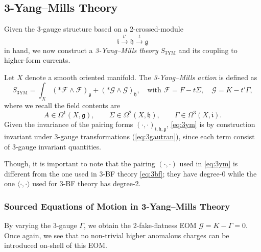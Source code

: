 \documentclass[onecolumn]{article}
\theoremstyle{theorem}
\theoremstyle{remark}
\theoremstyle{example}
\theoremstyle{definition}
\numberwithin{equation}{section}
\def\g{\mathfrak g}
\def\h{\mathfrak h}
\begin{document}
\subsection{3-Yang--Mills Theory}

Given the 3-gauge structure based on a 2-crossed-module $$ \mathfrak{i}\xrightarrow{t'}\mathfrak{h}\xrightarrow{t}\mathfrak{g}$$ 
in hand, we now construct a {\it {3-Yang--Mills theory}} $S_\text{3YM}$ and its coupling to higher-form currents.

Let $X$ denote a smooth oriented manifold. The {\it {3-Yang--Mills action}} is defined as \cite{Baez:2002highergauge,Song:2021}
\begin{equation}
    S_\text{3YM} = \int_X (\ast\mathcal{F}\wedge\mathcal{F})_\mathfrak{g}+(\ast\mathcal{G}\wedge \mathcal{G})_\h, \quad \textrm{with }  \mathcal{F} = F- t\Sigma,\quad \mathcal{G}=K - t'\Gamma,\label{eq:3ym}
\end{equation}
where we recall the field contents are
\begin{equation*}
    A\in \Omega^1(X,\mathfrak{g}),\qquad \Sigma\in\Omega^2(X,\mathfrak{h}),\qquad \Gamma\in\Omega^3(X,\mathfrak{i}).
\end{equation*}
{Given} the invariance of the pairing forms $(\cdot,\cdot)_{\mathfrak{i},\h,\g}$, \eqref{eq:3ym} is by construction invariant under 3-gauge transformations  (\ref{eq:3gautran}), since each term consist of 3-gauge invariant quantities. 


Though, it is important to note that the pairing $(\cdot,\cdot)$ used in \eqref{eq:3ym} is different from the one used in 3-BF theory \eqref{eq:3bf}; they have degree-0 while the one $\langle\cdot,\cdot\rangle$ used for 3-BF theory has degree-2.



\subsubsection{Sourced Equations of Motion in 3-Yang--Mills Theory}
By varying the 3-gauge $\Gamma$, we obtain the 2-fake-flatness EOM $\mathcal{G}=K-\Gamma=0$. Once again, we see that no non-trivial higher anomalous charges can be introduced on-shell of this EOM.
\end{document}

